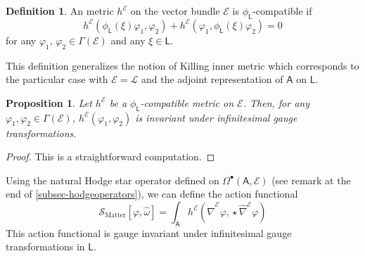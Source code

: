 \documentclass[number]{elsarticle}
\newtheorem{proposition}[theorem]{Proposition}
\theoremstyle{definition}
\newtheorem{definition}[theorem]{Definition}
\theoremstyle{remark}
\numberwithin{equation}{section}
\begin{document}
\begin{definition}
An metric $h^{{{{\mathcal{{E}}}}}}$ on the vector bundle ${{{{\mathcal{{E}}}}}}$ is $\phi_{{{{\mathbf{\mathsf{{L}}}}}}}$-compatible if 
\begin{equation*}
h^{{{{\mathcal{{E}}}}}}(\phi_{{{{\mathbf{\mathsf{{L}}}}}}}(\xi)\varphi_1, \varphi_2) + h^{{{{\mathcal{{E}}}}}}(\varphi_1,\phi_{{{{\mathbf{\mathsf{{L}}}}}}}(\xi)\varphi_2) = 0
\end{equation*} 
for any $\varphi_1,\,\varphi_2\in\Gamma({{{{\mathcal{{E}}}}}})$ and any $\xi \in {{{{\mathbf{\mathsf{{L}}}}}}}$.
\end{definition}

This definition generalizes the notion of Killing inner metric which corresponds to the particular case with ${{{{\mathcal{{E}}}}}} = {{{{\mathcal{{L}}}}}}$ and the adjoint representation of ${{{{\mathbf{\mathsf{{A}}}}}}}$ on ${{{{\mathbf{\mathsf{{L}}}}}}}$.

\begin{proposition}
Let $h^{{{{\mathcal{{E}}}}}}$ be a $\phi_{{{{\mathbf{\mathsf{{L}}}}}}}$-compatible metric on ${{{{\mathcal{{E}}}}}}$. Then, for any $\varphi_1, \varphi_2 \in \Gamma({{{{\mathcal{{E}}}}}})$, $h^{{{{\mathcal{{E}}}}}}(\varphi_1, \varphi_2)$ is invariant under infinitesimal gauge transformations.
\end{proposition}

\begin{proof}
This is a straightforward computation.
\end{proof}

Using the natural Hodge star operator defined on $\Omega^{\bullet}({{{{\mathbf{\mathsf{{A}}}}}}}, {{{{\mathcal{{E}}}}}})$ (see remark at the end of \ref{subsec-hodgeoperators}), we can define the action functional
\begin{equation*}
{\mathcal{S}}_\text{Matter}[\varphi,{\widehat{\omega}}] = \int_{{{{\mathbf{\mathsf{{A}}}}}}} h^{{{{\mathcal{{E}}}}}}({{\widehat{\nabla}}}^{{{{\mathcal{{E}}}}}} \varphi, {\mathop{\star}} {{\widehat{\nabla}}}^{{{{\mathcal{{E}}}}}} \varphi)
\end{equation*}
This action functional is gauge invariant under infinitesimal gauge transformations in ${{{{\mathbf{\mathsf{{L}}}}}}}$.
\end{document}
